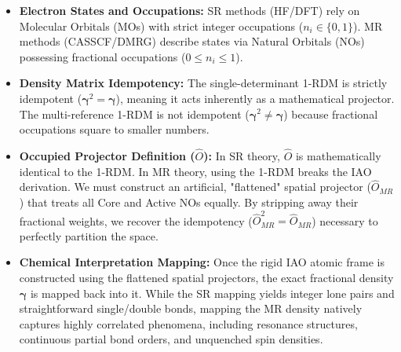 \documentclass[11pt]{article}
\begin{document}
\begin{itemize}
    \item \textbf{Electron States and Occupations:} SR methods (HF/DFT) rely on Molecular Orbitals (MOs) with strict integer occupations ($n_i \in \{0, 1\}$). MR methods (CASSCF/DMRG) describe states via Natural Orbitals (NOs) possessing fractional occupations ($0 \leq n_i \leq 1$).
    \item \textbf{Density Matrix Idempotency:} The single-determinant 1-RDM is strictly idempotent ($\boldsymbol{\gamma}^2 = \boldsymbol{\gamma}$), meaning it acts inherently as a mathematical projector. The multi-reference 1-RDM is not idempotent ($\boldsymbol{\gamma}^2 \neq \boldsymbol{\gamma}$) because fractional occupations square to smaller numbers.
    \item \textbf{Occupied Projector Definition ($\hat{O}$):} In SR theory, $\hat{O}$ is mathematically identical to the 1-RDM. In MR theory, using the 1-RDM breaks the IAO derivation. We must construct an artificial, "flattened" spatial projector ($\hat{O}_{MR}$) that treats all Core and Active NOs equally. By stripping away their fractional weights, we recover the idempotency ($\hat{O}_{MR}^2 = \hat{O}_{MR}$) necessary to perfectly partition the space.
    \item \textbf{Chemical Interpretation Mapping:} Once the rigid IAO atomic frame is constructed using the flattened spatial projectors, the exact fractional density $\boldsymbol{\gamma}$ is mapped back into it. While the SR mapping yields integer lone pairs and straightforward single/double bonds, mapping the MR density natively captures highly correlated phenomena, including resonance structures, continuous partial bond orders, and unquenched spin densities.
\end{itemize}
\end{document}

